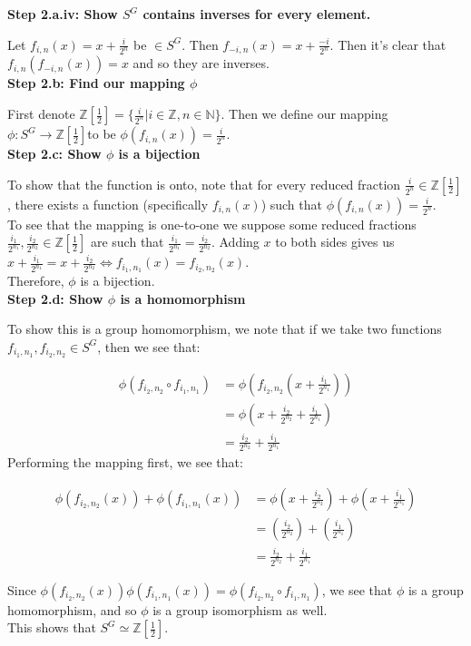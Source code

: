 \documentclass[12pt]{article}%
\newcommand{\N}{\mathbb{N}}
\newcommand{\Z}{\mathbb{Z}}
\begin{document}
\textbf{Step 2.a.iv: Show $S^G$ contains inverses for every element.}

Let $f_{i,n}(x)=x+\frac{i}{2^n}$ be $\in S^G$.  Then $f_{-i,n}(x)=x+\frac{-i}{2^n}$. Then it's clear that
$f_{i,n}(f_{-i,n}(x))=x$ and so they are inverses. \\

\textbf{Step 2.b: Find our mapping $\phi$}

First denote $\Z\left[\frac{1}{2}\right]=\{ \frac{i}{2^n} | i \in \Z, n \in \N \}$. Then we define our
mapping $\phi:S^G \rightarrow \Z\left[\frac{1}{2}\right]$to be $\phi(f_{i,n}(x))=\frac{i}{2^n}$. \\

\textbf{Step 2.c: Show $\phi$ is a bijection}

To show that the function is onto, note that for every reduced fraction
$\frac{i}{2^n} \in \Z[\frac{1}{2}]$, there exists a function (specifically $f_{i,n}(x)$) such that
$\phi(f_{i,n}(x))=\frac{i}{2^n}$. \\

To see that the mapping is one-to-one we suppose some reduced fractions
$\frac{i_{1}}{2^{n_1}}, \frac{i_{2}}{2^{n_2}} \in \Z[\frac{1}{2}]$ are such that
$\frac{i_{1}}{2^{n_1}} = \frac{i_{2}}{2^{n_2}}$. Adding $x$ to both sides gives us
$x+\frac{i_{1}}{2^{n_{1}}}=x+\frac{i_{2}}{2^{n_{2}}}\Leftrightarrow f_{i_{1},n_{1}}(x)=f_{i_{2},n_{2}}(x)$. \\

Therefore, $\phi$ is a bijection. \\

\textbf{Step 2.d: Show $\phi$ is a homomorphism}

To show this is a group homomorphism, we note that if we take two functions
$f_{i_{1},n_{1}}, f_{i_{2},n_{2}} \in S^G$, then we see that:

\begin{align*}
\phi\left(f_{i_{2},n_{2}} \circ f_{i_{1},n_{1}}\right)
&=\phi \left(f_{i_{2},n_{2}}\left(x+\frac{i_{1}}{2^{n_1}}\right)\right) \\
&=\phi\left(x+\frac{i_{2}}{2^{n_2}}+\frac{i_{1}}{2^{n_1}}\right) \\
&=\frac{i_{2}}{2^{n_2}}+\frac{i_{1}}{2^{n_1}}
\end{align*}
Performing the mapping first, we see that:

\begin{align*}
\phi\left(f_{i_{2},n_{2}}(x)\right)+\phi\left(f_{i_{1},n_{1}}(x)\right)
&=\phi \left(x+\frac{i_{2}}{2^{n_2}}\right)+\phi \left(x+\frac{i_{1}}{2^{n_1}}\right) \\
&=\left(\frac{i_{2}}{2^{n_2}}\right) + \left(\frac{i_{1}}{2^{n_1}}\right) \\
&=\frac{i_{2}}{2^{n_2}}+\frac{i_{1}}{2^{n_1}}
\end{align*}

Since $\phi\left(f_{i_{2},n_{2}}(x)\right)\phi\left(f_{i_{1},n_{1}}(x)\right)=\phi\left(f_{i_{2},n_{2}} \circ f_{i_{1},n_{1}}\right)$,
we see that $\phi$ is a group homomorphism, and so $\phi$ is a group isomorphism as well. \\

This shows that $S^G\simeq \Z\left[\frac{1}{2}\right]$.
\end{document}
